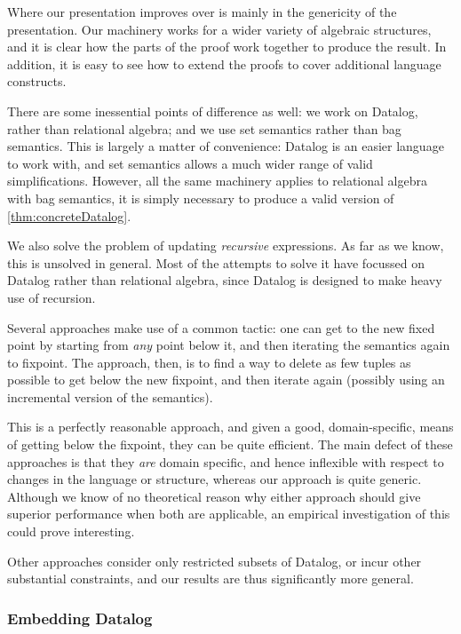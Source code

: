 Where our presentation improves over \citeauthor{griffin1997improved} is mainly in
the genericity of the presentation. Our machinery works for a wider variety of
algebraic structures, and it is clear how the parts of the proof work together
to produce the result. In addition, it is easy to see how to extend the proofs
to cover additional language constructs.

There are some inessential points of difference as well: we work on Datalog,
rather than relational algebra; and we use set semantics rather than bag
semantics. This is largely a matter of convenience: Datalog is an easier
language to work with, and set semantics allows a much wider range of valid
simplifications. However, all the same machinery applies to relational algebra
with bag semantics, it is simply necessary to produce a valid version of \cref{thm:concreteDatalog}.

We also solve the problem of updating \emph{recursive} expressions. As far as we
know, this is unsolved in general. Most of the attempts to solve it have
focussed on Datalog rather than relational algebra, since Datalog is designed to
make heavy use of recursion.

Several approaches
\autocites{gupta1993maintaining}{harrison1992maintenance}
make use of a common tactic: one can get to the new fixed
point by starting from \emph{any} point below it, and then iterating the
semantics again to fixpoint. The approach, then, is to find a way to delete as
few tuples as possible to get below the new fixpoint, and then iterate again
(possibly using an incremental version of the semantics).

This is a perfectly reasonable approach, and given a good, domain-specific,
means of getting below the fixpoint, they can be quite efficient.
The main defect of these approaches is that they \emph{are} domain specific,
and hence inflexible with respect to changes in the language or structure,
whereas our approach is quite generic. Although we know of no theoretical reason
why either approach should give superior performance when both are applicable,
an empirical investigation of this could prove interesting.

Other approaches \autocites{dong2000incremental}{urpi1992method} consider only
restricted subsets of Datalog, or incur other substantial constraints, and our results
are thus significantly more general.

\subsubsection{Embedding Datalog}
\label{sec:embeddingDatalog}

